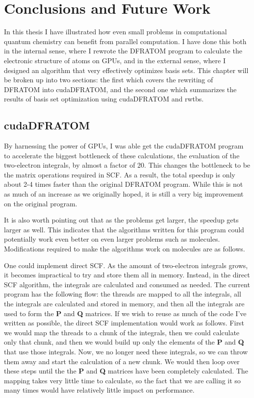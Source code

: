 \chapter{Conclusions and Future Work}

In this thesis I have illustrated how even small problems in computational quantum chemistry can benefit from parallel computation. I have done this both in the internal sense, where I rewrote the DFRATOM program to calculate the electronic structure of atoms on GPUs, and in the external sense, where I designed an algorithm that very effectively optimizes basis sets. This chapter will be broken up into two sections: the first which covers the rewriting of DFRATOM into cudaDFRATOM, and the second one which summarizes the results of basis set optimization using cudaDFRATOM and rwtbs.

\section{cudaDFRATOM}
By harnessing the power of GPUs, I was able get the cudaDFRATOM program to accelerate the biggest bottleneck of these calculations, the evaluation of the two-electron integrals, by almost a factor of 20. This changes the bottleneck to be the matrix operations required in SCF. As a result, the total speedup is only about 2-4 times faster than the original DFRATOM program. While this is not as much of an increase as we originally hoped, it is still a very big improvement on the original program.

It is also worth pointing out that as the problems get larger, the speedup gets larger as well. This indicates that the algorithms written for this program could potentially work even better on even larger problems such as molecules. Modifications required to make the algorithms work on molecules are as follows. 

One could implement direct SCF. As the amount of two-electron integrals grows, it becomes impractical to try and store them all in memory. Instead, in the direct SCF algorithm, the integrals are calculated and consumed as needed. The current program has the following flow: the threads are mapped to all the integrals, all the integrals are calculated and stored in memory, and then all the integrals are used to form the \textbf{P} and \textbf{Q} matrices. If we wish to reuse as much of the code I've written as possible, the direct SCF implementation would work as follows. First we would map the threads to a chunk of the integrals, then we could calculate only that chunk, and then we would build up only the elements of the \textbf{P} and \textbf{Q} that use those integrals. Now, we no longer need these integrals, so we can throw them away and start the calculation of a new chunk. We would then loop over these steps until the the \textbf{P} and \textbf{Q} matrices have been completely calculated. The mapping takes very little time to calculate, so the fact that we are calling it so many times would have relatively little impact on performance. 

